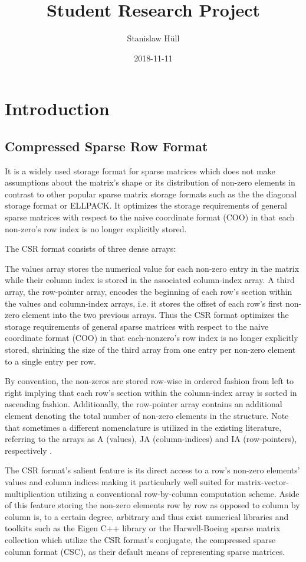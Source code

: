 \documentclass{article}
\author{Stanislaw Hüll}
\title{Student Research Project}
\date{2018-11-11}
\begin{document}
\maketitle

\section{Introduction}

  \subsection{Compressed Sparse Row Format}
    It is a widely used storage format for sparse matrices which does not make assumptions about the matrix's shape
    or its distribution of non-zero elements in contrast to other popular sparse matrix storage formats such as the
    the diagonal storage format or ELLPACK. It optimizes the storage requirements of general sparse matrices with
    respect to the naive coordinate format (COO) in that each non-zero's row index is no longer explicitly stored.

    The CSR format consists of three dense arrays:

    The values array stores the numerical value for each non-zero entry in the matrix while their column index is stored
    in the associated column-index array. A third array, the row-pointer array, encodes the beginning of each row's
    section within the values and column-index arrays, i.e. it stores the offset of each row's first non-zero element
    into the two previous arrays. Thus the CSR format optimizes the storage requirements of general sparse matrices with
    respect to the naive coordinate format (COO) in that each-nonzero's row index is no longer explicitly stored,
    shrinking the size of the third array from one entry per non-zero element to a single entry per row.


    By convention, the non-zeros are stored row-wise in ordered fashion from left to right implying that each row's
    section within the column-index array is sorted in ascending fashion. Additionally, the row-pointer array contains
    an additional element denoting the total number of non-zero elements in the structure. Note that sometimes a
    different nomenclature is utilized in the existing literature, referring to the arrays as A (values), JA
    (column-indices) and IA (row-pointers), respectively \cite{sparskit}.

    The CSR format's salient feature is its direct access to a row's non-zero elements' values and column indices making
    it particularly well suited for matrix-vector-multiplication utilizing a conventional row-by-column computation
    scheme. Aside of this feature storing the non-zero elements row by row as opposed to column by column is, to a
    certain degree, arbitrary and thus exist numerical libraries and toolkits such as the Eigen C++ library
    \cite{eigen:website} or the Harwell-Boeing sparse matrix collection \cite{harwell-boeing} which utilize the CSR
    format's conjugate, the compressed sparse column format (CSC), as their default means of representing sparse
    matrices.
\end{document}
